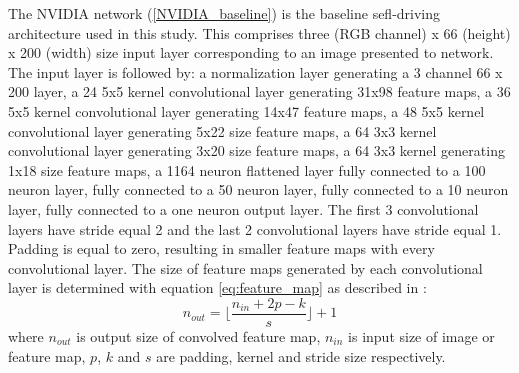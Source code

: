 The NVIDIA network (\ref{NVIDIA_baseline}) is the baseline sefl-driving architecture used in this study. This comprises three (RGB channel) x 66 (height) x 200 (width) size input layer corresponding to an image presented to network. The input layer is followed by: a normalization layer generating a 3 channel 66 x 200 layer, a 24 5x5 kernel convolutional layer generating 31x98 feature maps, a 36 5x5 kernel convolutional layer generating 14x47 feature maps, a 48 5x5 kernel convolutional layer generating 5x22 size feature maps, a 64 3x3 kernel convolutional layer generating 3x20 size feature maps, a 64 3x3 kernel generating 1x18 size feature maps, a 1164 neuron flattened layer fully connected to a 100 neuron layer, fully connected to a 50 neuron layer, fully connected to a 10 neuron layer, fully connected to a one neuron output layer.  
The first 3 convolutional layers have stride equal 2 and the last 2 convolutional layers have stride equal 1. Padding is equal to zero, resulting in smaller feature maps with every convolutional layer.
The size of feature maps generated by each convolutional layer is determined with equation \ref{eq:feature_map} as described in \cite{dumoulin2018guide}:
\begin{equation}
    \label{eq:feature_map}
    n_{out}= \Big\lfloor\frac{n_{in} + 2p -k}{s} \Big\rfloor +1
\end{equation}
where $n_{out}$ is output size of convolved feature map, $n_{in}$ is input size of image or feature map, $p$, $k$ and $s$ are padding, kernel and stride size respectively.  
 
